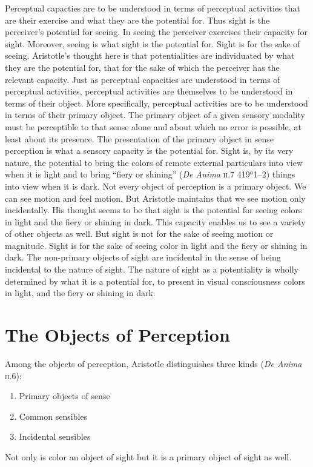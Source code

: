 Perceptual capacties are to be understood in terms of perceptual activities that are their exercise and what they are the potential for. Thus sight is the perceiver's potential for seeing. In seeing the perceiver exercises their capacity for sight. Moreover, seeing is what sight is the potential for. Sight is for the sake of seeing. Aristotle's thought here is that potentialities are individuated by what they are the potential for, that for the sake of which the perceiver has the relevant capacity. Just as perceptual capacities are understood in terms of perceptual activities, perceptual activities are themselves to be understood in terms of their object. More specifically, perceptual activities are to be understood in terms of their primary object. The primary object of a given sensory modality must be perceptible to that sense alone and about which no error is possible, at least about its presence. The presentation of the primary object in sense perception is what a sensory capacity is the potential for. Sight is, by its very nature, the potential to bring the colors of remote external particulars into view when it is light and to bring ``fiery or shining'' (\emph{De Anima} \textsc{ii}.7 419\( ^{a} \)1--2) things into view when it is dark. Not every object of perception is a primary object. We can see motion and feel motion. But Aristotle maintains that we see motion only incidentally. His thought seems to be that sight is the potential for seeing colors in light and the fiery or shining in dark. This capacity enables us to see a variety of other objects as well. But sight is not for the sake of seeing motion or magnitude. Sight is for the sake of seeing color in light and the fiery or shining in dark. The non-primary objects of sight are incidental in the sense of being incidental to the nature of sight. The nature of sight as a potentiality is wholly determined by what it is a potential for, to present in visual consciousness colors in light, and the fiery or shining in dark.


\section{The Objects of Perception} %
\label{sec:the_objects_of_perception}

Among the objects of perception, Aristotle distinguishes three kinds (\emph{De Anima} \textsc{ii}.6):
\begin{enumerate}[(1)]
	\item Primary objects of sense
	\item Common sensibles
	\item Incidental sensibles
\end{enumerate}
Not only is color an object of sight but it is a primary object of sight as well.

